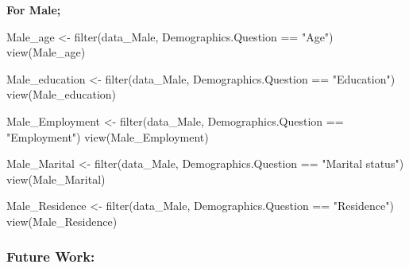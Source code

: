 \documentclass[
]{article}
\newenvironment{Shaded}{\begin{snugshade}}{\end{snugshade}}
\newcommand{\FunctionTok}[1]{\textcolor[rgb]{0.00,0.00,0.00}{#1}}
\newcommand{\NormalTok}[1]{#1}
\newcommand{\OtherTok}[1]{\textcolor[rgb]{0.56,0.35,0.01}{#1}}
\newcommand{\SpecialCharTok}[1]{\textcolor[rgb]{0.00,0.00,0.00}{#1}}
\newcommand{\StringTok}[1]{\textcolor[rgb]{0.31,0.60,0.02}{#1}}
\begin{document}
\textbf{For Male;}

\begin{Shaded}
\begin{Highlighting}[]
\NormalTok{  Male\_age }\OtherTok{\textless{}{-}} \FunctionTok{filter}\NormalTok{(data\_Male, Demographics.Question }\SpecialCharTok{==} \StringTok{"Age"}\NormalTok{)}
  \FunctionTok{view}\NormalTok{(Male\_age)}
\end{Highlighting}
\end{Shaded}

\begin{Shaded}
\begin{Highlighting}[]
\NormalTok{  Male\_education }\OtherTok{\textless{}{-}} \FunctionTok{filter}\NormalTok{(data\_Male, Demographics.Question }\SpecialCharTok{==} \StringTok{"Education"}\NormalTok{)}
  \FunctionTok{view}\NormalTok{(Male\_education)}
\end{Highlighting}
\end{Shaded}

\begin{Shaded}
\begin{Highlighting}[]
\NormalTok{  Male\_Employment }\OtherTok{\textless{}{-}} \FunctionTok{filter}\NormalTok{(data\_Male, Demographics.Question }\SpecialCharTok{==} \StringTok{"Employment"}\NormalTok{)}
  \FunctionTok{view}\NormalTok{(Male\_Employment)}
\end{Highlighting}
\end{Shaded}

\begin{Shaded}
\begin{Highlighting}[]
\NormalTok{  Male\_Marital }\OtherTok{\textless{}{-}} \FunctionTok{filter}\NormalTok{(data\_Male, Demographics.Question }\SpecialCharTok{==} \StringTok{"Marital status"}\NormalTok{)}
  \FunctionTok{view}\NormalTok{(Male\_Marital)}
\end{Highlighting}
\end{Shaded}

\begin{Shaded}
\begin{Highlighting}[]
\NormalTok{  Male\_Residence }\OtherTok{\textless{}{-}} \FunctionTok{filter}\NormalTok{(data\_Male, Demographics.Question }\SpecialCharTok{==} \StringTok{"Residence"}\NormalTok{)}
  \FunctionTok{view}\NormalTok{(Male\_Residence)}
\end{Highlighting}
\end{Shaded}

\hypertarget{future-work}{%
\subsubsection{Future Work:}\label{future-work}}
\end{document}
